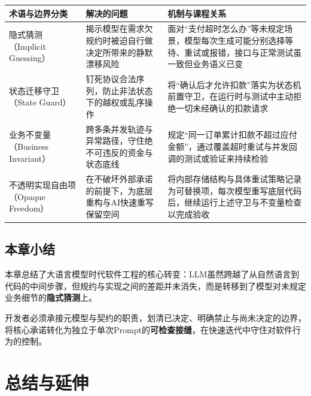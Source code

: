 \documentclass[UTF8,a4paper,11pt,fontset=fandol]{ctexart}
\begin{document}
\begin{center}\small\begin{tabularx}{\linewidth}{YYY}

\toprule

术语与边界分类 & 解决的问题 & 机制与课程关系\\\midrule

隐式猜测（Implicit Guessing） & 揭示模型在需求欠规约时被迫自行做决定所带来的静默漂移风险 & 面对“支付超时怎么办”等未规定场景，模型每次生成可能分别选择等待、重试或报错，接口与正常测试虽一致但业务语义已变\\[3pt]

状态迁移守卫（State Guard） & 钉死协议合法序列，防止非法状态下的越权或乱序操作 & 将“确认后才允许扣款”落实为状态机前置守卫，在运行时与测试中主动拒绝一切未经确认的扣款请求\\[3pt]

业务不变量（Business Invariant） & 跨多条并发轨迹与异常路径，守住绝不可违反的资金与状态底线 & 规定“同一订单累计扣款不超过应付金额”，通过覆盖超时重试与并发回调的测试或验证来持续检验\\[3pt]

不透明实现自由项（Opaque Freedom） & 在不破坏外部承诺的前提下，为底层重构与AI快速重写保留空间 & 将内部存储结构与具体重试策略记录为可替换项，每次模型重写底层代码后，继续运行上述守卫与不变量检查以完成验收\\[3pt]

\bottomrule\end{tabularx}\end{center}

\subsection{本章小结}

本章总结了大语言模型时代软件工程的核心转变：LLM虽然跨越了从自然语言到代码的中间步骤，但规约与实现之间的差距并未消失，而是转移到了模型对未规定业务细节的\textbf{隐式猜测}上。

开发者必须承接元模型与契约的职责，划清已决定、明确禁止与尚未决定的边界，将核心承诺转化为独立于单次Prompt的\textbf{可检查接缝}，在快速迭代中守住对软件行为的控制。

\section{总结与延伸}
\end{document}
